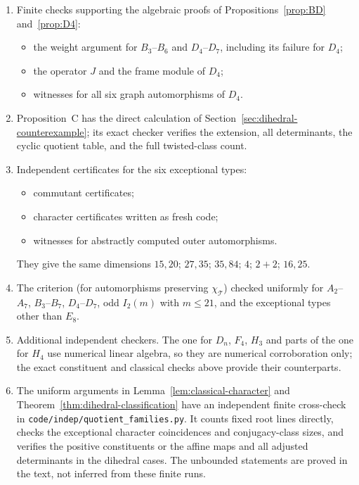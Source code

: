 \documentclass[11pt]{amsart}
\theoremstyle{definition}
\newcommand{\T}{\mathcal{T}}
\begin{document}
\begin{enumerate}[label=(\arabic*),resume]
\item Finite checks supporting the algebraic proofs of Propositions~\ref{prop:BD} and~\ref{prop:D4}:
\begin{itemize}
\item the weight argument for $B_3$--$B_6$ and $D_4$--$D_7$, including its failure for $D_4$;
\item the operator $J$ and the frame module of $D_4$;
\item witnesses for all six graph automorphisms of $D_4$.
\end{itemize}
\item Proposition~C has the direct calculation of Section~\ref{sec:dihedral-counterexample}; its exact
checker verifies the extension, all determinants, the cyclic quotient table, and the full twisted-class count.

\item Independent certificates for the six exceptional types:
\begin{itemize}
\item commutant certificates;
\item character certificates written as fresh code;
\item witnesses for abstractly computed outer automorphisms.
\end{itemize}
They give the same dimensions $15,20$; $27,35$; $35,84$; $4$; $2+2$; $16,25$.
\item The criterion (for automorphisms preserving $\chi_\T$) checked uniformly for $A_2$--$A_7$, $B_3$--$B_7$,
$D_4$--$D_7$, odd $I_2(m)$ with $m\le21$, and the exceptional types other than $E_8$.
\item Additional independent checkers. The one for $D_n$, $F_4$, $H_3$ and parts of the one
for $H_4$ use numerical linear algebra, so they are numerical corroboration only; the exact constituent and classical checks above provide their counterparts.
\item The uniform arguments in Lemma~\ref{lem:classical-character} and
Theorem~\ref{thm:dihedral-classification} have an independent finite cross-check in
\texttt{code/indep/quotient\_families.py}. It counts fixed root lines directly, checks the exceptional
character coincidences and conjugacy-class sizes, and verifies the positive constituents or the affine maps and all adjusted
determinants in the dihedral cases. The unbounded statements are proved in the text, not inferred
from these finite runs.
\end{enumerate}
\end{document}
